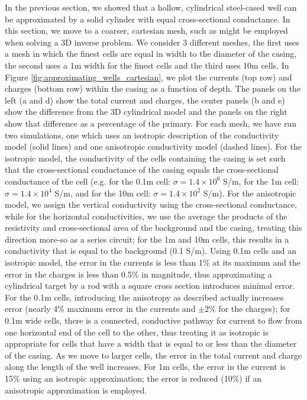 In the previous section, we showed that a hollow, cylindrical steel-cased well can be approximated by a solid cylinder with equal cross-sectional conductance. In this section, we move to a coarser, cartesian mesh, such as might be employed when solving a 3D inverse problem. We consider 3 different meshes, the first uses a mesh in which the finest cells are equal in width to the diameter of the casing, the second uses a 1m width for the finest cells and the third uses 10m cells. In Figure \ref{fig:approximating_wells_cartesian}, we plot the currents (top row) and charges (bottom row) within the casing as a function of depth. The panels on the left (a and d) show the total current and charges, the center panels (b and e) show the difference from the 3D cylindrical model and the panels on the right show that difference as a percentage of the primary. For each mesh, we have run two simulations, one which uses an isotropic description of the conductivity model (solid lines) and one anisotropic conductivity model (dashed lines). For the isotropic model, the conductivity of the cells containing the casing is set such that the cross-sectional conductance of the casing equals the cross-sectional conductance of the cell (e.g. for the 0.1m cell: $\sigma = 1.4 \times 10^6$ S/m, for the 1m cell: $\sigma = 1.4 \times 10^4$ S/m, and for the 10m cell: $\sigma = 1.4\times 10^2$ S/m). For the anisotropic model, we assign the vertical conductivity using the cross-sectional conductance, while for the horizontal conductivities, we use the average the products of the resistivity and cross-sectional area of the background and the casing, treating this direction more-so as a series circuit; for the 1m and 10m cells, this results in a conductivity that is equal to the background (0.1 S/m). Using 0.1m cells and an isotropic model, the error in the currents is less than 1\% at its maximum and the error in the charges is less than 0.5\% in magnitude, thus approximating a cylindrical target by a rod with a square cross section introduces minimal error. For the 0.1m cells, introducing the anisotropy as described actually increases error (nearly 4\% maximum error in the currents and $\pm 2\%$ for the charges); for 0.1m wide cells, there is a connected, conductive pathway for current to flow from one horizontal end of the cell to the other, thus treating it as isotropic is appropriate for cells that have a width that is equal to or less than the diameter of the casing. As we move to larger cells, the error in the total current and charge along the length of the well increases. For 1m cells, the error in the current is 15\% using an isotropic approximation; the error is reduced (10\%) if an anisotropic approximation is employed.

